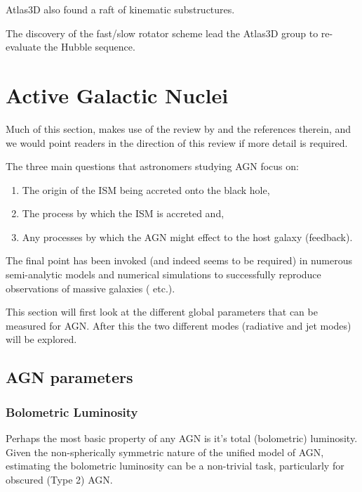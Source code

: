 	Atlas3D also found a raft of kinematic substructures. 


	The discovery of the fast/slow rotator scheme lead the Atlas3D group to re-evaluate the Hubble sequence.










\section{Active Galactic Nuclei}
	\label{sec:introAGN}
	Much of this section, makes use of the review by \citet{Heckman2014} and the references therein, and we would point readers in the direction of this review if more detail is required. 

	The three main questions that astronomers studying AGN focus on:
	\begin{enumerate}
		\item The origin of the ISM being accreted onto the black hole,
		\item The process by which the ISM is accreted and,
		\item Any processes by which the AGN might effect to the host galaxy (feedback).
	\end{enumerate}
	The final point has been invoked (and indeed seems to be required) in numerous semi-analytic models and numerical simulations to successfully reproduce observations of massive galaxies (\citet{DiMatteo2005, Bower2005, Springel2005} etc.). 

	This section will first look at the different global parameters that can be measured for AGN. After this the two different modes (radiative and jet modes) will be explored.

	\subsection{AGN parameters}
		\label{subsec:introAGNparams}

		\subsubsection{Bolometric Luminosity}
			Perhaps the most basic property of any AGN is it's total (bolometric) luminosity. Given the non-spherically symmetric nature of the unified model of AGN, estimating the bolometric luminosity can be a non-trivial task, particularly for obscured (Type 2) AGN. 

